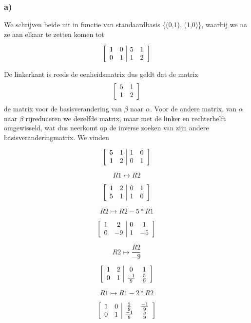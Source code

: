 \documentclass[lineaire_algebra_oplossingen.tex]{subfiles}
\begin{document}
\subsubsection*{a)}
We schrijven beide uit in functie van standaardbasis \{(0,1), (1,0)\}, waarbij we na ze aan elkaar te zetten komen tot

\[
\left[
\begin{array}{ c c | c c }
1 & 0 & 5 & 1\\
0 & 1 & 1 & 2
\end{array}
\right]
\]

De linkerkant is reeds de eenheidsmatrix dus geldt dat de matrix 
\[
\left[
\begin{array}{ c c }
5 & 1\\
1 & 2
\end{array}
\right]
\]
de matrix voor de basisverandering van $\beta$ naar $\alpha$. Voor de andere matrix, van $\alpha$ naar $\beta$ rijreduceren we dezelfde matrix, maar met de linker en rechterhelft omgewisseld, wat dus neerkomt op de inverse zoeken van zijn andere basisveranderingmatrix. We vinden

\[
\left[
\begin{array}{ c c | c c }
5 & 1 & 1 & 0\\
1 & 2 & 0 & 1
\end{array}
\right]
\]

\[R1 \leftrightarrow R2 \]

\[
\left[
\begin{array}{ c c | c c }
1 & 2 & 0 & 1\\
5 & 1 & 1 & 0
\end{array}
\right]
\]

\[R2 \mapsto R2 - 5*R1 \]

\[
\left[
\begin{array}{ c c | c c }
1 & 2 & 0 & 1\\
0 & -9 & 1 & -5
\end{array}
\right]
\]

\[R2 \mapsto \frac{R2}{-9} \]

\[
\left[
\begin{array}{ c c | c c }
1 & 2 & 0 & 1\\
0 & 1 & \frac{-1}{9} & \frac{5}{9}
\end{array}
\right]
\]

\[R1 \mapsto R1 - 2*R2 \]

\[
\left[
\begin{array}{ c c | c c }
1 & 0 & \frac{2}{9} & \frac{-1}{9}\\
0 & 1 & \frac{-1}{9} & \frac{5}{9}
\end{array}
\right]
\]
\end{document}
